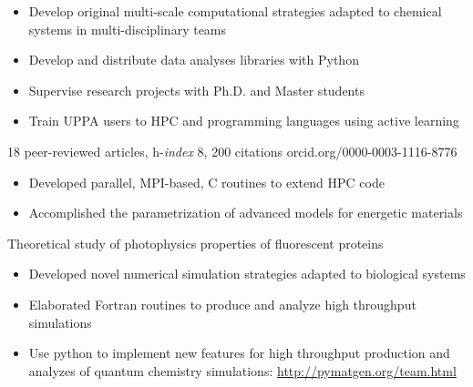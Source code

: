 \documentclass[10pt,a4paper,ragged2e]{../altacv}
\begin{document}
\begin{itemize}
\item Develop original multi-scale computational strategies adapted to chemical systems in multi-disciplinary teams
\item Develop and distribute data analyses libraries with Python
\item Supervise research projects with Ph.D. and Master students
\item Train UPPA users to HPC and programming languages using active learning
\end{itemize}
{\small 18 peer-reviewed articles, h-\textit{index} 8, 200 citations \hfill \hspace{-1ex}orcid.org/0000-0003-1116-8776}

\bigskip

\begin{itemize}
\item Developed parallel, MPI-based, C routines to extend HPC code
\item Accomplished the parametrization of advanced models for energetic materials
\end{itemize}

\bigskip

Theoretical study of photophysics properties of fluorescent proteins
\smallskip
\begin{itemize}
\item Developed novel numerical simulation strategies adapted to biological systems
\item Elaborated Fortran routines to produce and analyze high throughput simulations
\end{itemize}


\vspace{-2mm}
\begin{itemize}\setlength{\itemsep}{0ex}
    \item Use python to implement new features for high throughput production and analyzes of quantum chemistry simulations: \url{http://pymatgen.org/team.html}
\end{itemize}
\end{document}
